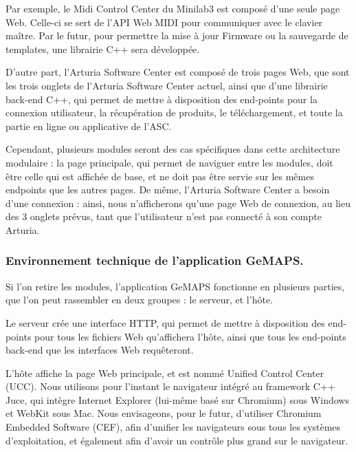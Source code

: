 \documentclass[francais]{rapportPFE}  %
\begin{document}
Par exemple, le Midi Control Center du Minilab3 est composé d'une seule page Web. Celle-ci se sert de l'API Web MIDI pour communiquer avec le clavier maître. Par le futur, pour permettre la mise à jour Firmware ou la sauvegarde de templates, une librairie C++ sera développée.

D'autre part, l'Arturia Software Center est composé de trois pages Web, que sont les trois onglets de l'Arturia Software Center actuel, ainsi que d'une librairie back-end C++, qui permet de mettre à disposition des end-points pour la connexion utilisateur, la récupération de produits, le téléchargement, et toute la partie en ligne ou applicative de l'ASC.

Cependant, plusieurs modules seront des cas spécifiques dans cette architecture modulaire :
la page principale, qui permet de naviguer entre les modules, doit être celle qui est affichée de base, et ne doit pas être servie sur les mêmes endpoints que les autres pages.
De même, l'Arturia Software Center a besoin d'une connexion : ainsi, nous n'afficherons qu'une page Web de connexion, au lieu des 3 onglets prévus, tant que l'utilisateur n'est pas connecté à son compte Arturia.



\subsubsection{Environnement technique de l'application GeMAPS.}

Si l'on retire les modules, l'application GeMAPS fonctionne en plusieurs parties, que l'on peut rassembler en deux groupes : le serveur, et l'hôte.

Le serveur crée une interface HTTP, qui permet de mettre à disposition des end-points pour tous les fichiers Web qu'affichera l'hôte, ainsi que tous les end-points back-end que les interfaces Web requêteront.

L'hôte affiche la page Web principale, et est nommé Unified Control Center (UCC). Nous utilisons pour l'instant le navigateur intégré au framework C++ Juce, qui intègre Internet Explorer (lui-même basé sur Chromium) sous Windows et WebKit sous Mac. Nous envisageons, pour le futur, d'utiliser Chromium Embedded Software (CEF), afin d'unifier les navigateurs sous tous les systèmes d'exploitation, et également afin d'avoir un contrôle plus grand sur le navigateur.
\end{document}
